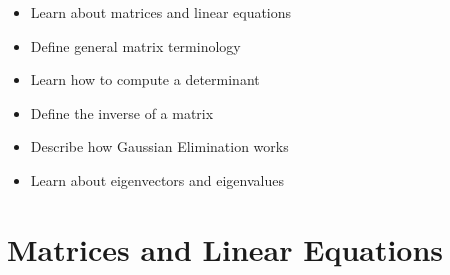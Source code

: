 %
\begin{learningobjectives}
{\begin{itemize}
    \item[{\color{OCBurntOrange}\ref{\chabbr:sec:matrices}:}] Learn about matrices and linear equations
    \item[{\color{OCBurntOrange}\ref{\chabbr:sec:matrixproperties}:}] Define general matrix terminology
    \item[{\color{OCBurntOrange}\ref{\chabbr:sec:determinant}:}] Learn how to compute a determinant
    \item[{\color{OCBurntOrange}\ref{\chabbr:sec:inverse}:}] Define the inverse of a matrix
    \item[{\color{OCBurntOrange}\ref{\chabbr:sec:GaussianElim}:}] Describe how Gaussian Elimination works
    \item[{\color{OCBurntOrange}\ref{\chabbr:sec:eigen}:}] Learn about eigenvectors and eigenvalues
\end{itemize}}
\end{learningobjectives}


\section{Matrices and Linear Equations}\label{\chabbr:sec:matrices}

